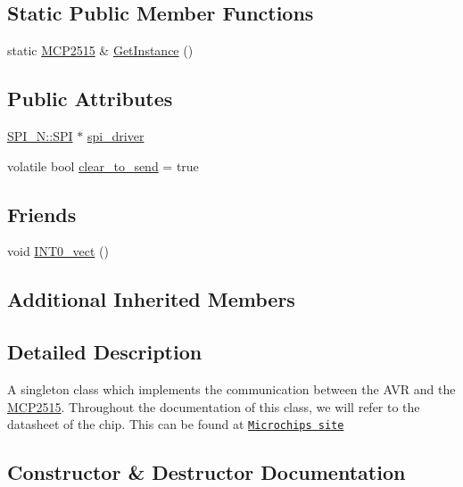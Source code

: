 \subsection*{Static Public Member Functions}
\begin{DoxyCompactItemize}
\item 
static \hyperlink{class_m_c_p2515}{M\+C\+P2515} \& \hyperlink{class_m_c_p2515_a3f53839a9258086fd21e2fc4190de60d}{Get\+Instance} ()
\end{DoxyCompactItemize}
\subsection*{Public Attributes}
\begin{DoxyCompactItemize}
\item 
\hyperlink{class_s_p_i___n_1_1_s_p_i}{S\+P\+I\+\_\+\+N\+::\+S\+PI} $\ast$ \hyperlink{class_m_c_p2515_a3a5ca0d606115f1551a06d871606540e}{spi\+\_\+driver}
\item 
volatile bool \hyperlink{class_m_c_p2515_a1418f0f66d9a57659809192552d5ac37}{clear\+\_\+to\+\_\+send} = true
\end{DoxyCompactItemize}
\subsection*{Friends}
\begin{DoxyCompactItemize}
\item 
void \hyperlink{class_m_c_p2515_aee50ec5936d22b665b9a06ff6bafd1b9}{I\+N\+T0\+\_\+vect} ()
\end{DoxyCompactItemize}
\subsection*{Additional Inherited Members}


\subsection{Detailed Description}
A singleton class which implements the communication between the A\+VR and the \hyperlink{class_m_c_p2515}{M\+C\+P2515}. Throughout the documentation of this class, we will refer to the datasheet of the chip. This can be found at \href{http://ww1.microchip.com/downloads/en/DeviceDoc/21801G.pdf}{\tt Microchips site} 

\subsection{Constructor \& Destructor Documentation}
